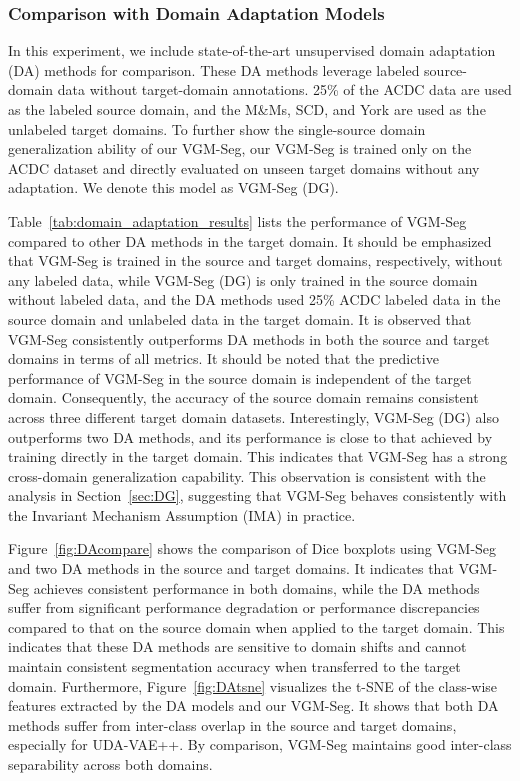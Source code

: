 \documentclass[preprint,12pt]{elsarticle}
\begin{document}
\subsubsection{Comparison with Domain Adaptation Models}

In this experiment, we include state-of-the-art unsupervised domain adaptation (DA) methods for comparison. These DA methods leverage labeled source-domain data without target-domain annotations. 25\% of the ACDC data are used as the labeled source domain, and the M\&Ms, SCD, and York are used as the unlabeled target domains.
% 
To further show the single-source domain generalization ability of our VGM-Seg, our VGM-Seg is trained only on the ACDC dataset and directly evaluated on unseen target domains without any adaptation. We denote this model as VGM-Seg (DG).



Table~\ref{tab:domain_adaptation_results} lists the performance of VGM-Seg compared to other DA methods in the target domain. It should be emphasized that VGM-Seg is trained in the source and target domains, respectively, without any labeled data, while VGM-Seg (DG) is only trained in the source domain without labeled data, and the DA methods used 25\% ACDC labeled data in the source domain and unlabeled data in the target domain.
It is observed that VGM-Seg consistently outperforms DA methods in both the source and target domains in terms of all metrics.
It should be noted that the predictive performance of VGM-Seg in the source domain is independent of the target domain. Consequently, the accuracy of the source domain remains consistent across three different target domain datasets.
Interestingly, VGM-Seg (DG) also outperforms two DA methods, and its performance is close to that achieved by training directly in the target domain. This indicates that VGM-Seg has a strong cross-domain generalization capability. This observation is consistent with the analysis in Section~\ref{sec:DG}, suggesting that VGM-Seg behaves consistently with the Invariant Mechanism Assumption (IMA) in practice.

Figure~\ref{fig:DAcompare} shows the comparison of Dice boxplots using VGM-Seg and two DA methods in the source and target domains. It indicates that VGM-Seg achieves consistent performance in both domains, while the DA methods suffer from significant performance degradation or performance discrepancies compared to that on the source domain when applied to the target domain. 
This indicates that these DA methods are sensitive to domain shifts and cannot maintain consistent segmentation accuracy when transferred to the target domain.
Furthermore, Figure~\ref{fig:DAtsne} visualizes the t-SNE of the class-wise features extracted by the DA models and our VGM-Seg. It shows that both DA methods suffer from inter-class overlap in the source and target domains, especially for UDA-VAE++. By comparison, VGM-Seg maintains good inter-class separability across both domains.
\end{document}
